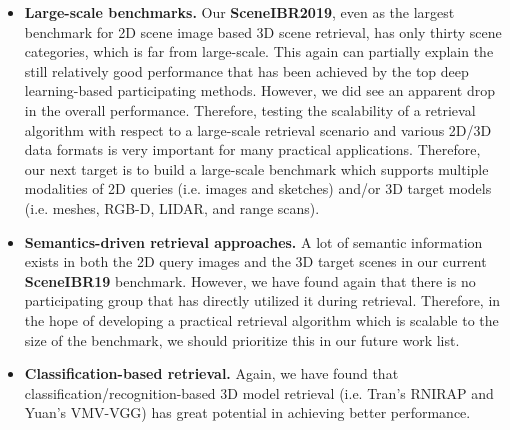 \documentclass[../main.tex]{subfiles}
\begin{document}
\begin{itemize}
	
	\item \textbf{Large-scale benchmarks.} Our \textbf{SceneIBR2019}, even as the largest benchmark for 2D scene image based 3D scene retrieval, has only thirty scene categories, which is far from large-scale. This again can partially explain the still relatively good performance that has been achieved by the top deep learning-based participating methods. However, we did see an apparent drop in the overall performance. Therefore, testing the scalability of a retrieval algorithm with respect to a large-scale retrieval scenario and various 2D/3D data formats is very important for many practical applications. Therefore, our next target is to build a large-scale benchmark which supports multiple modalities of 2D queries (i.e. images and sketches) and/or 3D target models (i.e. meshes, RGB-D, LIDAR, and range scans).
	
	\item \textbf{Semantics-driven retrieval approaches.} A lot of semantic information exists in both the 2D query images and the 3D target scenes in our current \textbf{SceneIBR19} benchmark. However, we have found again that there is no participating group that has directly utilized it during retrieval. Therefore, in the hope of developing a practical retrieval algorithm which is scalable to the size of the benchmark, we should prioritize this in our future work list.
	
	\item \textbf{Classification-based retrieval.} Again, we have found that classification/recognition-based 3D model retrieval (i.e. Tran's RNIRAP and Yuan's VMV-VGG) has great potential in achieving better performance.
	
	
\end{itemize}
\end{document}
